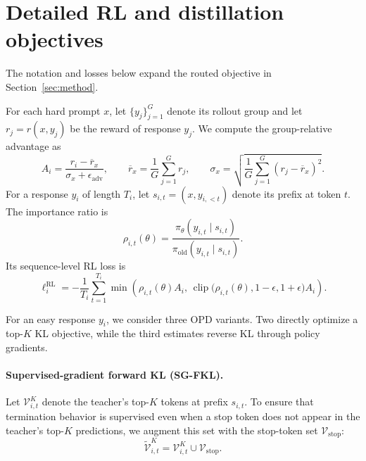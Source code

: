 \section{Detailed RL and distillation objectives}
\label{app:objectives}

The notation and losses below expand the routed objective in Section~\ref{sec:method}.

For each hard prompt $x$, let $\{y_j\}_{j=1}^{G}$ denote its rollout group and
let $r_j=r(x,y_j)$ be the reward of response $y_j$. We compute the
group-relative advantage as
\begin{equation}
  A_i
  =
  \frac{r_i-\overline r_x}{\sigma_x+\epsilon_{\mathrm{adv}}},
  \qquad
  \overline r_x
  =
  \frac{1}{G}\sum_{j=1}^{G}r_j,
  \qquad
  \sigma_x
  =
  \sqrt{
    \frac{1}{G}
    \sum_{j=1}^{G}
    (r_j-\overline r_x)^2
  }.
  \label{eq:group-relative-advantage}
\end{equation}
For a response $y_i$ of length $T_i$, let
$s_{i,t}=(x,y_{i,<t})$ denote its prefix at token $t$. The importance ratio is
\begin{equation}
  \rho_{i,t}(\theta)
  =
  \frac{\pi_\theta(y_{i,t}\mid s_{i,t})}
       {\pi_{\mathrm{old}}(y_{i,t}\mid s_{i,t})}.
\end{equation}
Its sequence-level RL loss is
\begin{equation}
  \ell_i^{\mathrm{RL}}
  =
  -\frac{1}{T_i}
  \sum_{t=1}^{T_i}
  \min\left(
    \rho_{i,t}(\theta)A_i,\,
    \operatorname{clip}
    \bigl(\rho_{i,t}(\theta),1-\epsilon,1+\epsilon\bigr)A_i
  \right).
  \label{eq:rl-sequence-loss}
\end{equation}

For an easy response $y_i$, we consider three OPD variants. Two directly
optimize a top-$K$ KL objective, while the third estimates reverse KL through
policy gradients.

\paragraph{Supervised-gradient forward KL (SG-FKL).}
Let $\mathcal V_{i,t}^{K}$ denote the teacher's top-$K$ tokens at prefix
$s_{i,t}$. To ensure that termination behavior is supervised even when a stop token does not appear in the teacher's top-$K$ predictions, we augment this set with the stop-token set
$\mathcal V_{\mathrm{stop}}$:
\begin{equation}
  \widetilde{\mathcal V}_{i,t}^{K}
  =
  \mathcal V_{i,t}^{K}
  \cup
  \mathcal V_{\mathrm{stop}}.
\end{equation}

